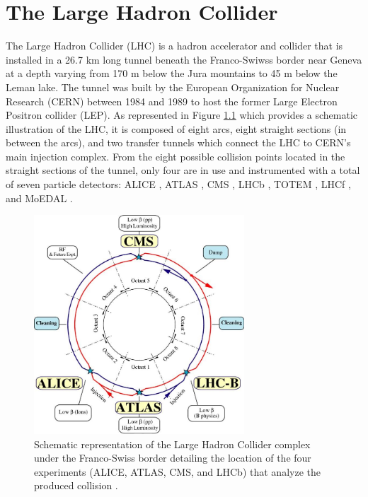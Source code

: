 
\chapter{The Large Hadron Collider}
\label{chap:I-2-lhc}

	The Large Hadron Collider (LHC) \cite{Evans:2008zzb} is a hadron accelerator and collider that is installed in a 26.7 km long tunnel beneath the Franco-Swiwss border near Geneva at a depth varying from 170 m below the Jura mountains to 45 m below the Leman lake. The tunnel was built by the European Organization for Nuclear Research (CERN) between 1984 and 1989 to host the former Large Electron Positron collider (LEP). As represented in Figure \ref{fig:I-2-lhc-schematic} which provides a schematic illustration of the LHC, it is composed of eight arcs, eight straight sections (in between the arcs), and two transfer tunnels which connect the LHC to CERN's main injection complex. From the eight possible collision points located in the straight sections of the tunnel, only four are in use and instrumented with a total of seven particle detectors: ALICE \cite{1748-0221-3-08-S08002}, ATLAS \cite{1748-0221-3-08-S08003}, CMS \cite{1748-0221-3-08-S08004}, LHCb \cite{1748-0221-3-08-S08005}, TOTEM \cite{1748-0221-3-08-S08007}, LHCf \cite{1748-0221-3-08-S08006}, and MoEDAL \cite{Acharya:2014nyr}. \\

	\begin{figure}[h!]
		\centering
		\includegraphics[width=0.7\textwidth]{img/I-2-lhc/lhc.jpg}
		\caption{Schematic representation of the Large Hadron Collider complex under the Franco-Swiss border detailing the location of the four experiments (ALICE, ATLAS, CMS, and LHCb) that analyze the produced collision \cite{Evans:2008zzb}.}
		\label{fig:I-2-lhc-schematic}
	\end{figure}

